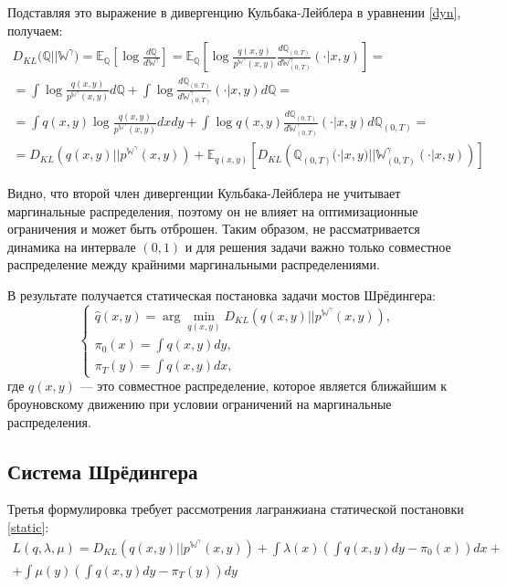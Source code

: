 Подставляя это выражение в дивергенцию Кульбака-Лейблера в уравнении \ref{dyn}, получаем:
\begin{equation*}
    \begin{split}
        D_{KL}\mathbb{(Q||W}^\gamma) = \mathbb{E_Q}\left[\log \frac{d\mathbb{Q}}{d\mathbb{W}^\gamma}\right] = \mathbb{E_Q}\left[\log \frac{q(x, y)}{p^{\mathbb{W}^\gamma}(x, y)}\frac{d\mathbb{Q}_{(0,T)}}{d\mathbb{W}^\gamma_{(0,T)}}(\cdot|x,y)\right] = \\ = \int\log \frac{q(x, y)}{p^{\mathbb{W}^\gamma}(x, y)} d\mathbb{Q} + \int\log \frac{d\mathbb{Q}_{(0,T)}}{d\mathbb{W}^\gamma_{(0,T)}}(\cdot|x,y)d\mathbb{Q}= \\ = \int q(x, y)\log \frac{q(x, y)}{p^{\mathbb{W}^\gamma}(x, y)} dxdy + \int\log q(x, y)\frac{d\mathbb{Q}_{(0,T)}}{d\mathbb{W}^\gamma_{(0,T)}}(\cdot|x,y)d\mathbb{Q}_{(0,T)} = \\ = D_{KL}\left(q(x, y) || p^{\mathbb{W}^\gamma}(x, y)\right) + \mathbb{E}_{q(x, y)}\left[D_{KL}\left(\mathbb{Q}_{(0,T)}(\cdot|x,y) || \mathbb{W}^\gamma_{(0,T)}(\cdot|x,y)\right)\right]
    \end{split}
\end{equation*}

Видно, что второй член дивергенции Кульбака-Лейблера не учитывает маргинальные распределения, поэтому он не влияет на оптимизационные ограничения и может быть отброшен. Таким образом, не рассматривается динамика на интервале $(0, 1)$ и для решения задачи важно только совместное распределение между крайними маргинальными распределениями. 

В результате получается статическая постановка задачи мостов Шрёдингера:
\begin{equation}
    \left\{ 
    \begin{array}{c}
        \hat q(x,y) = \arg\min_{q(x,y)} D_{KL}(q(x,y)||p^{\mathbb{W}^\gamma}(x,y)), \\
        \pi_0(x) = \int q(x,y)dy, \\
        \pi_T(y) = \int q(x,y)dx,
        \label{static}
    \end{array}\right.
\end{equation}
где $q(x,y)$ — это совместное распределение, которое является ближайшим к броуновскому движению при условии ограничений на маргинальные распределения. 

\subsection{Система Шрёдингера}
Третья формулировка требует рассмотрения лагранжиана статической постановки \ref{static}:
\begin{equation*}
    \begin{split}
        L(q, \lambda, \mu) = D_{KL}(q(x,y)||p^{\mathbb{W}^\gamma}(x,y)) + \int \lambda(x)\left(\int q(x, y)dy - \pi_0(x)\right)dx + \\ + \int \mu(y)\left(\int q(x, y)dy - \pi_T(y)\right)dy
    \end{split}
\end{equation*}

